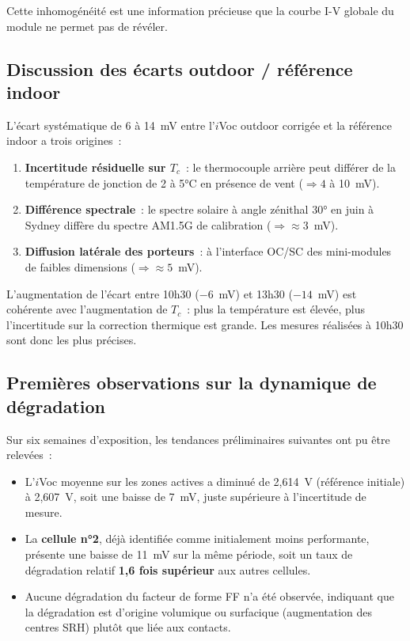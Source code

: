 \documentclass[12pt,a4paper]{report}
\begin{document}
Cette inhomogénéité est une information précieuse que la courbe I-V globale du module ne permet pas de révéler.

\subsection{Discussion des écarts outdoor / référence indoor}

L'écart systématique de 6 à 14~mV entre l'$i$Voc outdoor corrigée et la référence indoor a trois origines~:

\begin{enumerate}
  \item \textbf{Incertitude résiduelle sur $T_c$}~: le thermocouple arrière peut différer de la température de jonction de 2 à 5°C en présence de vent ($\Rightarrow 4$ à 10~mV).
  \item \textbf{Différence spectrale}~: le spectre solaire à angle zénithal 30° en juin à Sydney diffère du spectre AM1.5G de calibration ($\Rightarrow \approx 3$~mV).
  \item \textbf{Diffusion latérale des porteurs}~: à l'interface OC/SC des mini-modules de faibles dimensions ($\Rightarrow \approx 5$~mV).
\end{enumerate}

L'augmentation de l'écart entre 10h30 ($-6$~mV) et 13h30 ($-14$~mV) est cohérente avec l'augmentation de $T_c$~: plus la température est élevée, plus l'incertitude sur la correction thermique est grande. Les mesures réalisées à 10h30 sont donc les plus précises.

\subsection{Premières observations sur la dynamique de dégradation}

Sur six semaines d'exposition, les tendances préliminaires suivantes ont pu être relevées~:

\begin{itemize}
  \item L'$i$Voc moyenne sur les zones actives a diminué de 2,614~V (référence initiale) à 2,607~V, soit une baisse de 7~mV, juste supérieure à l'incertitude de mesure.
  \item La \textbf{cellule n°2}, déjà identifiée comme initialement moins performante, présente une baisse de 11~mV sur la même période, soit un taux de dégradation relatif \textbf{1,6 fois supérieur} aux autres cellules.
  \item Aucune dégradation du facteur de forme FF n'a été observée, indiquant que la dégradation est d'origine volumique ou surfacique (augmentation des centres SRH) plutôt que liée aux contacts.
\end{itemize}
\end{document}
